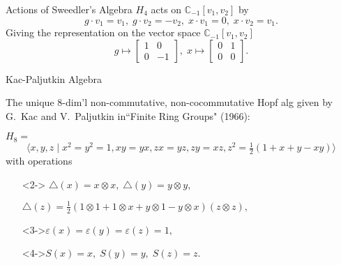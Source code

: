 \documentclass{beamer}
\begin{document}
\begin{frame}{Actions of Sweedler's Algebra}
    $H_4$ acts on $\mathbb{C}_{-1}[v_1,v_2]$ by 
    \[
      g\cdot v_1=v_1,\; g\cdot v_2=-v_2,\; x\cdot v_1=0,\; x\cdot v_2=v_1.  
    \]
    \pause
    Giving the representation on the vector space $\mathbb{C}_{-1}[v_1,v_2]$
    \[
    g\mapsto \begin{bmatrix}1&0\\0&-1\end{bmatrix},\; x\mapsto\begin{bmatrix}0&1\\0&0\end{bmatrix}.    
    \]
\end{frame}


\begin{frame}{Kac-Paljutkin Algebra}

 The unique $8$-dim'l non-commutative, non-cocommutative Hopf alg given by G.\ Kac and V.\ Paljutkin in``Finite Ring Groups" (1966):\newline

    $H_8=$
    \[\Big\langle x,y,z\;\vert\; x^2=y^2=1,xy=yx,zx=yz,zy=xz,z^2=\tfrac{1}{2}(1+x+y-xy)\Big\rangle\]
    with operations
    \vspace{2ex}
    \begin{itemize}
    \setlength{\itemsep}{2ex}
    \item[]<2->
    $\triangle(x)=x\otimes x,\; \triangle(y)=y\otimes y,\;$ 
    
    \vspace{2ex}
    
    $\triangle(z)=\tfrac{1}{2}(1\otimes 1+1\otimes x+y\otimes 1-y\otimes x)(z\otimes z),\;$
    
    \item[]<3->$
    \varepsilon(x)=\varepsilon(y)=\varepsilon(z)=1,$

    \item[]<4->$ S(x)=x,\;S(y)=y,\;S(z)=z.$ 
    \end{itemize}
\end{frame}
\end{document}
